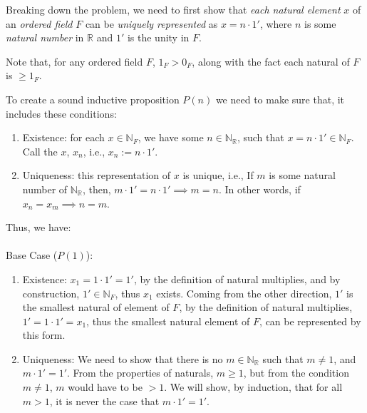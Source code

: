 \documentclass[12pt]{book}
\theoremstyle{definition}
\begin{document}
\begin{sol}
Breaking down the problem, we need to first show that \textit{each natural element} $x$ of an \textit{ordered field}  $F$ can be \textit{uniquely represented} as $x=n\cdot 1'$, where $n$ is some \textit{natural number} in $\mathbb{R}$ and $1'$ is the unity in $F$.

Note that, for any ordered field $F$, $1_F>0_F$, along with the fact each natural of $F$ is $\geq 1_F$.   

To create a sound inductive proposition $P(n)$ we need to make sure that, it includes these conditions:
\begin{enumerate}
	\item Existence: for each $x \in \mathbb{N}_F$, we have some $n \in \mathbb{N}_\mathbb{R}$, such that $x=n\cdot 1' \in \mathbb{N}_F$. Call the $x$, $x_n$, i.e., $x_n :=n\cdot 1'$.   
	\item Uniqueness: this representation of $x$ is unique, i.e., If $m$ is some natural number of $\mathbb{N}_\mathbb{R}$, then, $m\cdot 1' = n\cdot 1' \implies m=n$. In other words, if $x_n=x_m \implies n=m$. 
\end{enumerate}
Thus, we have:\\
\\
Base Case ($P(1)$):
\begin{enumerate}[label=$\bullet$]
	\item Existence: $x_1 = 1\cdot 1' =1'$, by the definition of natural multiplies, and by construction, $1' \in \mathbb{N}_F$, thus $x_1$ exists. Coming from the other direction, $1'$ is the smallest natural of element of $F$, by the definition of natural multiplies, $1'=1\cdot 1'= x_1$, thus the smallest natural element of $F$, can be represented by this form.
	\item Uniqueness: We need to show that there is no $m \in \mathbb{N}_\mathbb{R}$ such that $m\neq 1$, and $m\cdot 1'=1'$. From the properties of naturals, $m\geq 1$, but from the condition $m\neq 1$, $m$ would have to be $>1$. We will show, by induction, that for all $m>1$, it is never the case that $m\cdot 1'=1'$.
	

\end{enumerate}
\end{sol}
\end{document}
